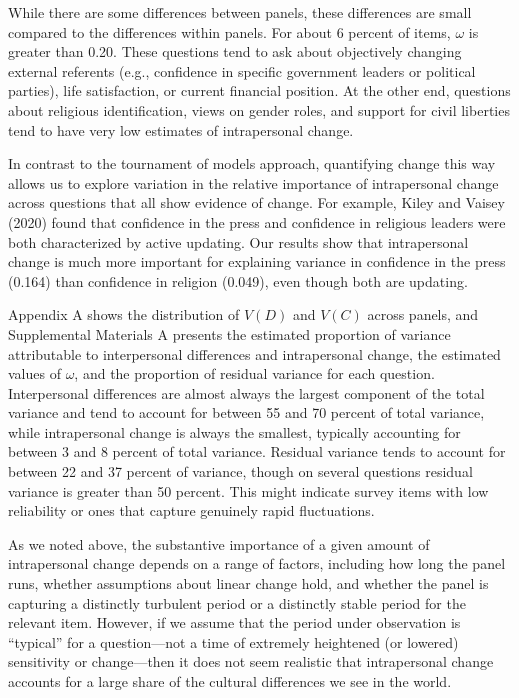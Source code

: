 \documentclass[
  12pt,
]{article}
\begin{document}
While there are some differences between panels, these differences are
small compared to the differences within panels. For about 6 percent of
items, \(\omega\) is greater than 0.20. These questions tend to ask
about objectively changing external referents (e.g., confidence in
specific government leaders or political parties), life satisfaction, or
current financial position. At the other end, questions about religious
identification, views on gender roles, and support for civil liberties
tend to have very low estimates of intrapersonal change.

In contrast to the tournament of models approach, quantifying change
this way allows us to explore variation in the relative importance of
intrapersonal change across questions that all show evidence of change.
For example, Kiley and Vaisey (2020) found that confidence in the press
and confidence in religious leaders were both characterized by active
updating. Our results show that intrapersonal change is much more
important for explaining variance in confidence in the press (0.164)
than confidence in religion (0.049), even though both are updating.

Appendix A shows the distribution of \(V(D)\) and \(V(C)\) across
panels, and Supplemental Materials A presents the estimated proportion
of variance attributable to interpersonal differences and intrapersonal
change, the estimated values of \(\omega\), and the proportion of
residual variance for each question. Interpersonal differences are
almost always the largest component of the total variance and tend to
account for between 55 and 70 percent of total variance, while
intrapersonal change is always the smallest, typically accounting for
between 3 and 8 percent of total variance. Residual variance tends to
account for between 22 and 37 percent of variance, though on several
questions residual variance is greater than 50 percent. This might
indicate survey items with low reliability or ones that capture
genuinely rapid fluctuations.

As we noted above, the substantive importance of a given amount of
intrapersonal change depends on a range of factors, including how long
the panel runs, whether assumptions about linear change hold, and
whether the panel is capturing a distinctly turbulent period or a
distinctly stable period for the relevant item. However, if we assume
that the period under observation is ``typical'' for a question---not a
time of extremely heightened (or lowered) sensitivity or change---then
it does not seem realistic that intrapersonal change accounts for a
large share of the cultural differences we see in the world.
\end{document}
